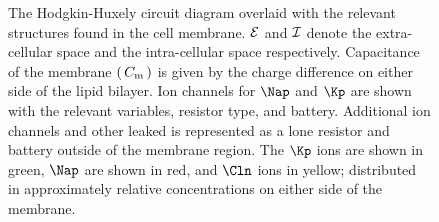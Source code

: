 \documentclass[Orator.tex]{subfiles}
\begin{document}
\begin{figure}[h]

    \caption{The Hodgkin-Huxely circuit diagram overlaid with the relevant structures found in the cell membrane. \(\mathcal{E}\) and \(\mathcal{I}\) denote the extra-cellular space and the intra-cellular space respectively. Capacitance of the membrane \(\br{C_\rmm{m}}\) is given by the charge difference on either side of the lipid bilayer. Ion channels for \(\Nap\) and \(\Kp\) are shown with the relevant variables, resistor type, and battery. Additional ion channels and other leaked is represented as a lone resistor and battery outside of the membrane region. The \(\Kp\) ions are shown in green, \(\Nap\) are shown in red, and \(\Cln\) ions in yellow; distributed in approximately relative concentrations on either side of the membrane. }\label{fig:MembraneCircut}
\end{figure}
\end{document}
